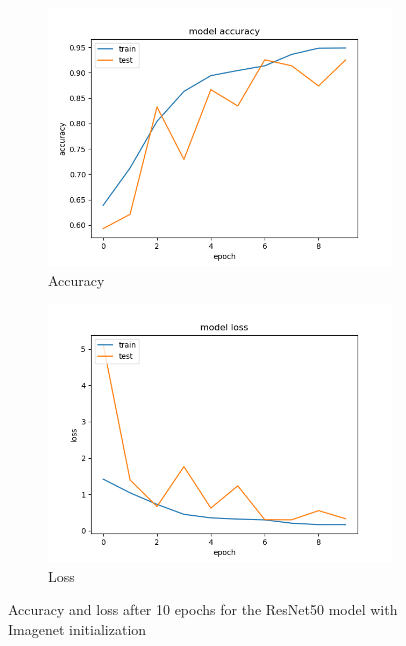 \documentclass{article}
\theoremstyle{definition}
\theoremstyle{remark}
\begin{document}
\begin{figure}[h!]
\centering
\begin{subfigure}{.5\textwidth}
  \centering
  \includegraphics[width=1.2\linewidth]{img/pre-trained_models/ResNet50_pretrained_acc.png}
  \caption{Accuracy}
  \label{fig:sub1}
\end{subfigure}%
\begin{subfigure}{.5\textwidth}
  \centering
  \includegraphics[width=1.2\linewidth]{img/pre-trained_models/ResNet50_pretrained_loss.png}
  \caption{Loss}
  \label{fig:sub2}
\end{subfigure}
\caption{Accuracy and loss after 10 epochs for the ResNet50 model with Imagenet initialization}
\label{fig:resnet50_ten_epochs_imagenet}
\end{figure}
\end{document}
